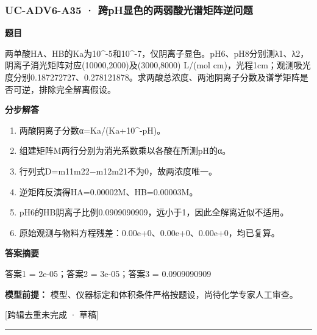 \documentclass[UTF8,11pt,a4paper]{ctexart}
\begin{document}
\subsubsection*{UC-ADV6-A35 · 跨pH显色的两弱酸光谱矩阵逆问题}
\noindent\textbf{题目}\par
两单酸HA、HB的Ka为10\textasciicircum{}-5和10\textasciicircum{}-7，仅阴离子显色。pH6、pH8分别测λ1、λ2，阴离子消光矩阵对应(10000,2000)及(3000,8000) L/(mol cm)，光程1cm；观测吸光度分别0.187272727、0.278121878。求两酸总浓度、两池阴离子分数及谱学矩阵是否可逆，排除完全解离假设。\par
\medskip\noindent\textbf{分步解答}
\begin{enumerate}
\item 两酸阴离子分数α=Ka/(Ka+10\textasciicircum{}-pH)。
\item 组建矩阵M两行分别为消光系数乘以各酸在所测pH的α。
\item 行列式D=m11m22−m12m21不为0，故两浓度唯一。
\item 逆矩阵反演得HA=0.00002M、HB=0.00003M。
\item pH6的HB阴离子比例0.0909090909，远小于1，因此全解离近似不适用。
\item 原始观测与物料方程残差：0.00e+0、0.00e+0、0.00e+0，均已复算。
\end{enumerate}
\noindent\textbf{答案摘要}\par
答案1 = 2e-05；答案2 = 3e-05；答案3 = 0.0909090909\par
\noindent\textbf{模型前提：}
模型、仪器标定和体积条件严格按题设，尚待化学专家人工审查。\par
\noindent\textcolor{red!65!black}{[跨辑去重未完成 · 草稿]} \par
\medskip\hrule\medskip
{}
\end{document}
